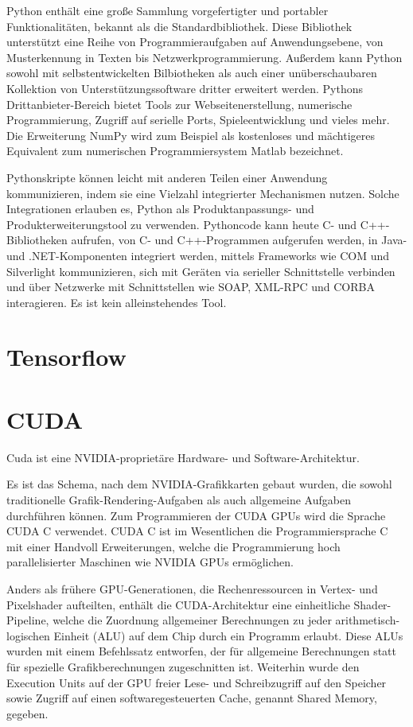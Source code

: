 Python enthält eine große Sammlung vorgefertigter und portabler Funktionalitäten, bekannt als die Standardbibliothek. Diese Bibliothek unterstützt eine Reihe von Programmieraufgaben auf Anwendungsebene, von Musterkennung in Texten bis Netzwerkprogrammierung. Außerdem kann Python sowohl mit selbstentwickelten Bilbiotheken als auch einer unüberschaubaren Kollektion von Unterstützungssoftware dritter erweitert werden. Pythons Drittanbieter-Bereich bietet Tools zur Webseitenerstellung, numerische Programmierung, Zugriff auf serielle Ports, Spieleentwicklung und vieles mehr. Die Erweiterung NumPy wird zum Beispiel als kostenloses und mächtigeres Equivalent zum numerischen Programmiersystem Matlab bezeichnet.

Pythonskripte können leicht mit anderen Teilen einer Anwendung kommunizieren, indem sie eine Vielzahl integrierter Mechanismen nutzen. Solche Integrationen erlauben es, Python als Produktanpassungs- und Produkterweiterungstool zu verwenden. Pythoncode kann heute C- und C++-Bibliotheken aufrufen, von C- und C++-Programmen aufgerufen werden, in Java- und .NET-Komponenten integriert werden, mittels Frameworks wie COM und Silverlight kommunizieren, sich mit Geräten via serieller Schnittstelle verbinden und über Netzwerke mit Schnittstellen wie SOAP, XML-RPC und CORBA interagieren. Es ist kein alleinstehendes Tool. \cite{lutz2013python}

\section{Tensorflow}
\label{subsec:tensorflow}

\section{CUDA}
\label{subsec:cuda}
Cuda ist eine NVIDIA-proprietäre Hardware- und Software-Architektur.

Es ist das Schema, nach dem NVIDIA-Grafikkarten gebaut wurden, die sowohl traditionelle Grafik-Rendering-Aufgaben als auch allgemeine Aufgaben durchführen können. Zum Programmieren der CUDA GPUs wird die Sprache CUDA C verwendet. CUDA C ist im Wesentlichen die Programmiersprache C mit einer Handvoll Erweiterungen, welche die Programmierung hoch parallelisierter Maschinen wie NVIDIA GPUs ermöglichen. \cite{sanders2010cuda}

Anders als frühere GPU-Generationen, die Rechenressourcen in Vertex- und Pixelshader aufteilten, enthält die CUDA-Architektur eine einheitliche Shader-Pipeline, welche die Zuordnung allgemeiner Berechnungen zu jeder arithmetisch-logischen Einheit (ALU) auf dem Chip durch ein Programm erlaubt. Diese ALUs wurden mit einem Befehlssatz entworfen, der für allgemeine Berechnungen statt für spezielle Grafikberechnungen zugeschnitten ist. Weiterhin wurde den Execution Units auf der GPU freier Lese- und Schreibzugriff auf den Speicher sowie Zugriff auf einen softwaregesteuerten Cache, genannt Shared Memory, gegeben. \cite{sanders2010cuda}

